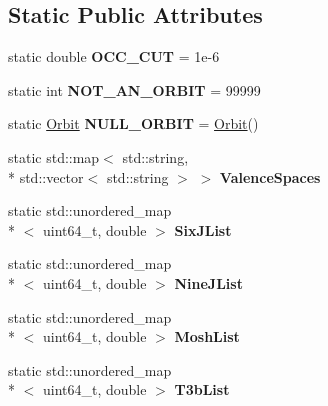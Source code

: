 \subsection*{Static Public Attributes}
\begin{DoxyCompactItemize}
\item 
\hypertarget{classModelSpace_a28df3fcc2dcf7509bf97590f84c00204}{static double {\bfseries O\-C\-C\-\_\-\-C\-U\-T} = 1e-\/6}\label{classModelSpace_a28df3fcc2dcf7509bf97590f84c00204}

\item 
\hypertarget{classModelSpace_a4bce899c089e940f9d22ad73336a57c0}{static int {\bfseries N\-O\-T\-\_\-\-A\-N\-\_\-\-O\-R\-B\-I\-T} = 99999}\label{classModelSpace_a4bce899c089e940f9d22ad73336a57c0}

\item 
\hypertarget{classModelSpace_a577d364c60dfcc0fde1681d7344d3f37}{static \hyperlink{structOrbit}{Orbit} {\bfseries N\-U\-L\-L\-\_\-\-O\-R\-B\-I\-T} = \hyperlink{structOrbit}{Orbit}()}\label{classModelSpace_a577d364c60dfcc0fde1681d7344d3f37}

\item 
static std\-::map$<$ std\-::string, \\*
std\-::vector$<$ std\-::string $>$ $>$ {\bfseries Valence\-Spaces}
\item 
\hypertarget{classModelSpace_af6bd9ab44e6ae41af6bc8b1bba353360}{static std\-::unordered\-\_\-map\\*
$<$ uint64\-\_\-t, double $>$ {\bfseries Six\-J\-List}}\label{classModelSpace_af6bd9ab44e6ae41af6bc8b1bba353360}

\item 
\hypertarget{classModelSpace_a41b96c5af74d6813de7ef314707fbe65}{static std\-::unordered\-\_\-map\\*
$<$ uint64\-\_\-t, double $>$ {\bfseries Nine\-J\-List}}\label{classModelSpace_a41b96c5af74d6813de7ef314707fbe65}

\item 
\hypertarget{classModelSpace_a022d742964d160c05570951936846b59}{static std\-::unordered\-\_\-map\\*
$<$ uint64\-\_\-t, double $>$ {\bfseries Mosh\-List}}\label{classModelSpace_a022d742964d160c05570951936846b59}

\item 
\hypertarget{classModelSpace_a89498143ea32ae46473b40d45d9934b7}{static std\-::unordered\-\_\-map\\*
$<$ uint64\-\_\-t, double $>$ {\bfseries T3b\-List}}\label{classModelSpace_a89498143ea32ae46473b40d45d9934b7}

\end{DoxyCompactItemize}


